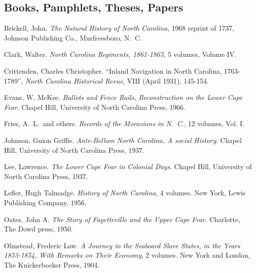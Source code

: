 \documentclass[11pt, a5paper, openright]{book}
\begin{document}
\begin{thebibliography}{99}

\section*{Books, Pamphlets, Theses, Papers}

  Brickell, John.  \emph{The Natural History of North Carolina}, 1968
  reprint of 1737, Johnson Publishing Co., Murfreesboro, N.~C.

  Clark, Walter.  \emph{North Carolina Regiments, 1861-1865}, %
  5 volumes, Volume IV. %

  Crittenden, Charles Christopher.  ``Inland Navigation in North Carolina, 1763-1789'', %
  \emph{North Carolina Historical Revue}, VIII (April 1931), 145-154. %

  Evans, W. McKee.  \emph{Ballots and Fence Rails, Reconstruction on the Lower Cape Fear}.
  Chapel Hill, University of North Carolina Press, 1966.

  Fries, A.~L.~and others.  \emph{Records of the Moravians in N.~C.},
  12 volumes, Vol. I.

  Johnson, Guion Griffis.  \emph{Ante-Bellum North Carolina, A social History}.
  Chapel Hill, University of North Carolina Press, 1937.

  Lee, Lawrence.  \emph{The Lower Cape Fear in Colonial Days}.
  Chapel Hill, University of North Carolina Press, 1937.

  Lefler, Hugh Talmadge.  \emph{History of North Carolina}, 4 volumes.  New
  York, Lewis Publishing Company, 1956.

  Oates, John A.  \emph{The Story of Fayetteville and the Upper Cape Fear}.
  Charlotte, The Dowd press, 1950.

  Olmstead, Frederic Law.  \emph{A Journey in the Seaboard Slave States, in the
    Years 1853-1854, With Remarks on Their Economy}, 2 volumes.  New York and %
  London, The Knickerbocker Press, 1904.


\end{thebibliography}
\end{document}

